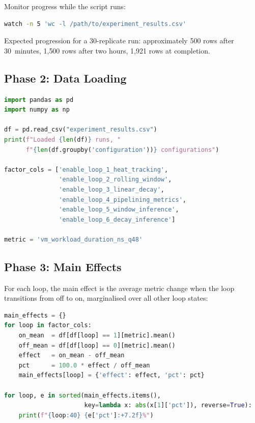 Monitor progress while the script runs:

\begin{lstlisting}[language=bash]
watch -n 5 'wc -l /path/to/experiment_results.csv'
\end{lstlisting}

Expected progression for a 30-replicate run: approximately 500 rows after
30~minutes, 1{,}500 rows after two hours, 1{,}921 rows at completion.

\subsection{Phase 2: Data Loading}

\begin{lstlisting}[language=Python]
import pandas as pd
import numpy as np

df = pd.read_csv("experiment_results.csv")
print(f"Loaded {len(df)} runs, "
      f"{len(df.groupby('configuration'))} configurations")

factor_cols = ['enable_loop_1_heat_tracking',
               'enable_loop_2_rolling_window',
               'enable_loop_3_linear_decay',
               'enable_loop_4_pipelining_metrics',
               'enable_loop_5_window_inference',
               'enable_loop_6_decay_inference']

metric = 'vm_workload_duration_ns_q48'
\end{lstlisting}


\subsection{Phase 3: Main Effects}

For each loop, the main effect is the average metric change when the loop
transitions from off to on, marginalised over all other loop states:

\begin{lstlisting}[language=Python]
main_effects = {}
for loop in factor_cols:
    on_mean  = df[df[loop] == 1][metric].mean()
    off_mean = df[df[loop] == 0][metric].mean()
    effect   = on_mean - off_mean
    pct      = 100.0 * effect / off_mean
    main_effects[loop] = {'effect': effect, 'pct': pct}

for loop, e in sorted(main_effects.items(),
                      key=lambda x: abs(x[1]['pct']), reverse=True):
    print(f"{loop:40} {e['pct']:+7.2f}%")
\end{lstlisting}

